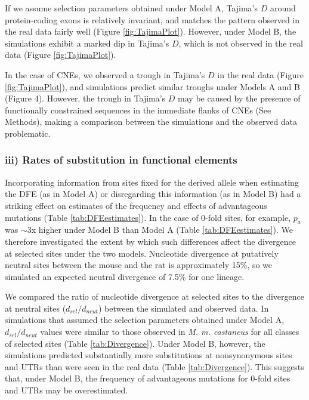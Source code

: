 	If we assume selection parameters obtained under Model A, Tajima's $D$ around protein-coding exons is relatively invariant, and matches the pattern observed in the real data fairly well (Figure \ref{fig:TajimaPlot}). However, under Model B, the simulations exhibit a marked dip in Tajima's $D$, which is not observed in the real data (Figure \ref{fig:TajimaPlot}).

	In the case of CNEs, we observed a trough in Tajima's $D$ in the real data (Figure \ref{fig:TajimaPlot}), and simulations predict similar troughs under Models A and B (Figure 4). However, the trough in Tajima's $D$ may be caused by the presence of functionally constrained sequences in the immediate flanks of CNEs (See Methods), making a comparison between the simulations and the observed data problematic.

\subsubsection{iii) Rates of substitution in functional elements}

Incorporating information from sites fixed for the derived allele when estimating the DFE (as in Model A) or disregarding this information (as in Model B) had a striking effect on estimates of the frequency and effects of advantageous mutations (Table \ref{tab:DFEestimates}). In the case of 0-fold sites, for example, $p_a$ was $\sim$3x higher under Model B than Model A (Table \ref{tab:DFEestimates}). We therefore investigated the extent by which such differences affect the divergence at selected sites under the two models. Nucleotide divergence at putatively neutral sites between the mouse and the rat is approximately 15\%, so we simulated an expected neutral divergence of 7.5\% for one lineage. 

We compared the ratio of nucleotide divergence at selected sites to the divergence at neutral sites ($d_{sel}/d_{neut}$) between the simulated and observed data. In simulations that assumed the selection parameters obtained under Model A, $d_{sel}/d_{neut}$ values were similar to those observed in \textit{M. m. castaneus} for all classes of selected sites (Table \ref{tab:Divergence}). Under Model B, however, the simulations predicted substantially more substitutions at nonsynonymous sites and UTRs than were seen in the real data (Table \ref{tab:Divergence}). This suggests that, under Model B, the frequency of advantageous mutations for 0-fold sites and UTRs may be overestimated.

